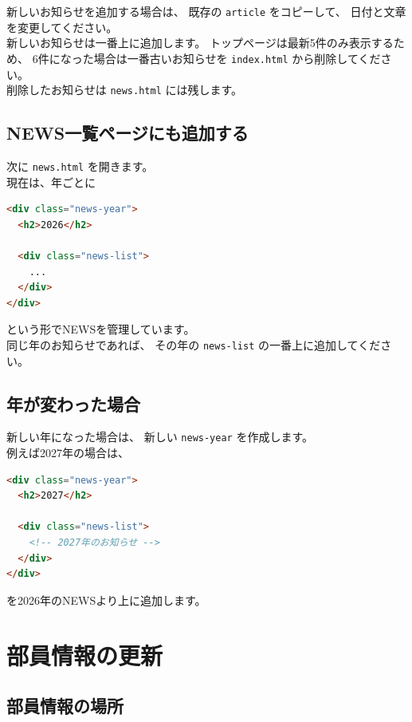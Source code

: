 \documentclass[a4paper,11pt]{ltjsarticle}
\begin{document}
新しいお知らせを追加する場合は、
既存の \texttt{article} をコピーして、
日付と文章を変更してください。\\
新しいお知らせは一番上に追加します。
トップページは最新5件のみ表示するため、
6件になった場合は一番古いお知らせを
\texttt{index.html} から削除してください。\\
削除したお知らせは
\texttt{news.html} には残します。


\subsection{NEWS一覧ページにも追加する}

次に \texttt{news.html} を開きます。\\
現在は、年ごとに

\begin{lstlisting}[language=HTML]
<div class="news-year">
  <h2>2026</h2>

  <div class="news-list">
    ...
  </div>
</div>
\end{lstlisting}

という形でNEWSを管理しています。\\
同じ年のお知らせであれば、
その年の \texttt{news-list} の一番上に追加してください。


\subsection{年が変わった場合}

新しい年になった場合は、
新しい \texttt{news-year} を作成します。\\
例えば2027年の場合は、

\begin{lstlisting}[language=HTML]
<div class="news-year">
  <h2>2027</h2>

  <div class="news-list">
    <!-- 2027年のお知らせ -->
  </div>
</div>
\end{lstlisting}

を2026年のNEWSより上に追加します。


\section{部員情報の更新}

\subsection{部員情報の場所}
\end{document}
